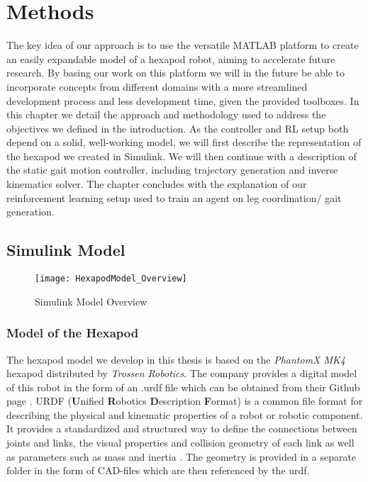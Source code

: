 \chapter{Methods}
\label{ch:methods}

The key idea of our approach is to use the versatile MATLAB platform to create an easily expandable model of a hexapod robot, aiming to accelerate future research.
By basing our work on this platform we will in the future be able to incorporate concepts from different domains with a more streamlined development process and less development time, given the provided toolboxes.
In this chapter we detail the approach and methodology used to address the objectives we defined in the introduction.
As the controller and RL setup both depend on a solid, well-working model, we will first describe the representation of the hexapod we created in Simulink.
We will then continue with a description of the static gait motion controller, including trajectory generation and inverse kinematics solver.
The chapter concludes with the explanation of our reinforcement learning setup used to train an agent on leg coordination/ gait generation.


\section{Simulink Model}

\begin{figure}[h]
	\centerline{\texttt{[image: HexapodModel\_Overview]}}
	\caption{Simulink Model Overview}
	\label{figure: Simulink Model Overview}
\end{figure}

\subsection{Model of the Hexapod}
The hexapod model we develop in this thesis is based on the \textit{PhantomX MK4} hexapod distributed by \textit{Trossen Robotics}.
The company provides a digital model of this robot in the form of an .urdf file which can be obtained from their Github page \parencite{interboticsGithub}.
URDF (\textbf{U}nified \textbf{R}obotics \textbf{D}escription \textbf{F}ormat) is a common file format for describing the physical and kinematic properties of a robot or robotic component.
It provides a standardized and structured way to define the connections between joints and links, the visual properties and collision geometry of each link as well as parameters such as mass and inertia \parencite{matlabURDFDocumentation}.
The geometry is provided in a separate folder in the form of CAD-files which are then referenced by the urdf.

